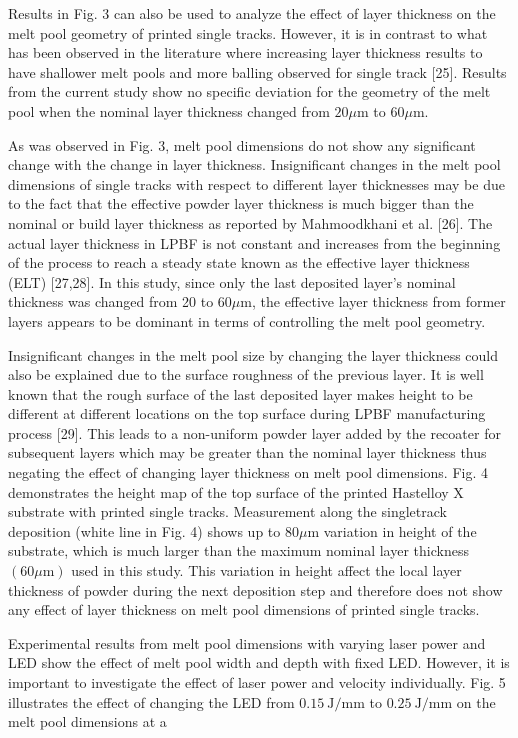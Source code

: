 \documentclass[10pt]{article}
\begin{document}
Results in Fig. 3 can also be used to analyze the effect of layer thickness on the melt pool geometry of printed single tracks. However, it is in contrast to what has been observed in the literature where increasing layer thickness results to have shallower melt pools and more balling observed for single track [25]. Results from the current study show no specific deviation for the geometry of the melt pool when the nominal layer thickness changed from $20 \mu \mathrm{m}$ to $60 \mu \mathrm{m}$.

As was observed in Fig. 3, melt pool dimensions do not show any significant change with the change in layer thickness. Insignificant changes in the melt pool dimensions of single tracks with respect to different layer thicknesses may be due to the fact that the effective powder layer thickness is much bigger than the nominal or build layer thickness as reported by Mahmoodkhani et al. [26]. The actual layer thickness in LPBF is not constant and increases from the beginning of the process to reach a steady state known as the effective layer thickness (ELT) [27,28]. In this study, since only the last deposited layer's nominal thickness was changed from 20 to $60 \mu \mathrm{m}$, the effective layer thickness from former layers appears to be dominant in terms of controlling the melt pool geometry.

Insignificant changes in the melt pool size by changing the layer thickness could also be explained due to the surface roughness of the previous layer. It is well known that the rough surface of the last deposited layer makes height to be different at different locations on the top surface during LPBF manufacturing process [29]. This leads to a non-uniform powder layer added by the recoater for subsequent layers which may be greater than the nominal layer thickness thus negating the effect of changing layer thickness on melt pool dimensions. Fig. 4 demonstrates the height map of the top surface of the printed Hastelloy $\mathrm{X}$ substrate with printed single tracks. Measurement along the singletrack deposition (white line in Fig. 4) shows up to $80 \mu \mathrm{m}$ variation in height of the substrate, which is much larger than the maximum nominal layer thickness $(60 \mu \mathrm{m})$ used in this study. This variation in height affect the local layer thickness of powder during the next deposition step and therefore does not show any effect of layer thickness on melt pool dimensions of printed single tracks.

Experimental results from melt pool dimensions with varying laser power and LED show the effect of melt pool width and depth with fixed LED. However, it is important to investigate the effect of laser power and velocity individually. Fig. 5 illustrates the effect of changing the LED from $0.15 \mathrm{~J} / \mathrm{mm}$ to $0.25 \mathrm{~J} / \mathrm{mm}$ on the melt pool dimensions at a
\end{document}

